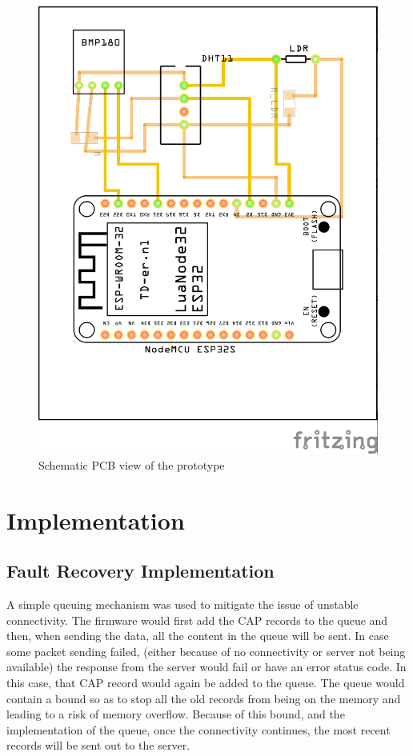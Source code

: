 \documentclass[12pt,a4paper]{article}
\begin{document}
\begin{figure}[H]
    \centering
    \includegraphics[width=\textwidth]{./images/schematic_pcb.png}
    \caption{Schematic PCB view of the prototype}
\end{figure}

\newpage


\section{Implementation}

\subsection{Fault Recovery Implementation}

A simple queuing mechanism was used to mitigate the issue of unstable connectivity.
The firmware would first add the CAP records to the queue and then, when sending the data,
all the content in the queue will be sent.
In case some packet sending failed, (either because of no connectivity or server not being available)
the response from the server would fail or have an error status code.
In this case, that CAP record would again be added to the queue.
The queue would contain a bound so as to stop all the old records from being
on the memory and leading to a risk of memory overflow. Because of this bound, and
the implementation of the queue, once the connectivity continues, the most recent
records will be sent out to  the server.
\end{document}
